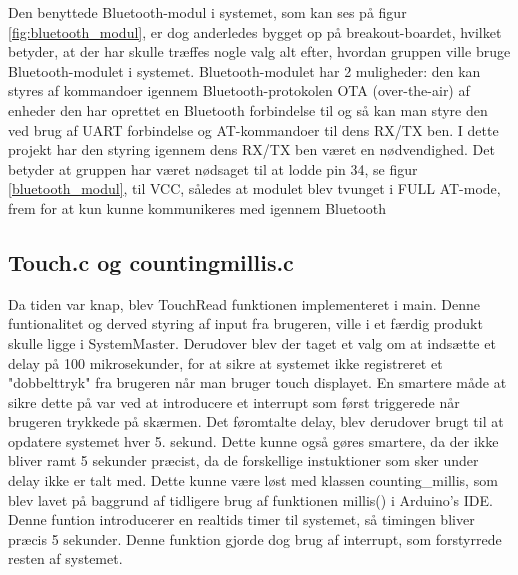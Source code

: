 Den benyttede Bluetooth-modul i systemet, som kan ses på figur \ref{fig:bluetooth_modul}, er dog anderledes bygget op på breakout-boardet, hvilket betyder, at der har skulle træffes nogle valg alt efter, hvordan gruppen ville bruge Bluetooth-modulet i systemet. Bluetooth-modulet har 2 muligheder: den kan styres af kommandoer igennem Bluetooth-protokolen OTA (over-the-air) af enheder den har oprettet en Bluetooth forbindelse til og så kan man styre den ved brug af UART forbindelse og AT-kommandoer til dens RX/TX ben. I dette projekt har den styring igennem dens RX/TX ben været en nødvendighed. Det betyder at gruppen har været nødsaget til at lodde pin 34, se figur \ref{bluetooth_modul}, til VCC, således at modulet blev tvunget i FULL AT-mode, frem for at kun kunne kommunikeres med igennem Bluetooth

\subsection{Touch.c og countingmillis.c}
Da tiden var knap, blev TouchRead funktionen implementeret i main. Denne funtionalitet og derved styring af input fra brugeren, ville i et færdig produkt skulle ligge i SystemMaster. Derudover blev der taget et valg om at indsætte et delay på 100 mikrosekunder, for at sikre at systemet ikke registreret et "dobbelttryk" fra brugeren når man bruger touch displayet. En smartere måde at sikre dette på var ved at introducere et interrupt som først triggerede når brugeren trykkede på skærmen. Det føromtalte delay, blev derudover brugt til at opdatere systemet hver 5. sekund. Dette kunne også gøres smartere, da der ikke bliver ramt 5 sekunder præcist, da de forskellige instuktioner som sker under delay ikke er talt med. Dette kunne være løst med klassen counting\_millis, som blev lavet på baggrund af tidligere brug af funktionen millis() i Arduino's IDE. Denne funtion introducerer en realtids timer til systemet, så timingen bliver præcis 5 sekunder. Denne funktion gjorde dog brug af interrupt, som forstyrrede resten af systemet.   
